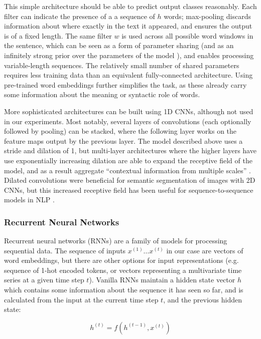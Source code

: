 This simple architecture should be able to predict output classes reasonably.
Each filter can indicate the presence of a a sequence of $h$ words; max-pooling discards information about where exactly in the text it appeared, and ensures the output is of a fixed length.
The same filter $w$ is used across all possible word windows in the sentence, which can be seen as a form of parameter sharing (and as an infinitely strong prior over the parameters of the model \cite{dlb}), and enables processing variable-length sequences.
The relatively small number of shared parameters requires less training data than an equivalent fully-connected architecture.
Using pre-trained word embeddings further simplifies the task, as these already carry some information about the meaning or syntactic role of words.

More sophisticated architectures can be built using 1D CNNs, although not used in our experiments.
Most notably, several layers of convolutions (each optionally followed by pooling) can be stacked, where the following layer works on the feature maps output by the previous layer.
The model described above uses a stride and dilation of 1, but multi-layer architectures where the higher layers have use exponentially increasing dilation are able to expand the receptive field of the model, and as a result aggregate ``contextual information from multiple scales'' \cite{dilated}.
Dilated convolutions were beneficial for semantic segmentation of images with 2D CNNs, but this increased receptive field has been useful for sequence-to-sequence models in NLP \cite{dilated_decoder}.

\subsubsection{Recurrent Neural Networks}
\label{rnn}

Recurrent neural networks (RNNs) are a family of models for processing sequential data.
The sequence of inputs $x^{(1)} \dots x^{(t)}$ in our case are vectors of word embeddings, but there are other options for input representations (e.g. sequence of 1-hot encoded tokens, or vectors representing a multivariate time series at a given time step $t$).
Vanilla RNNs maintain a hidden state vector $h$ which contains some information about the sequence it has seen so far, and is calculated from the input at the current time step $t$, and the previous hidden state:

\begin{equation}
  h^{(t)} = f(h^{(t-1)},x^{(t)})
\end{equation}

